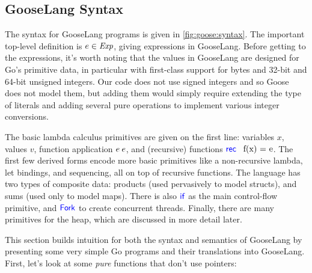 \subsection{GooseLang Syntax}%
\label{sec:goose:syntax}



The syntax for GooseLang programs is given in \cref{fig:goose:syntax}. The
important top-level definition is $e \in \textit{Exp}$, giving expressions in
GooseLang. Before getting to the expressions, it's worth noting that the values
in GooseLang are designed for Go's primitive data, in particular with
first-class support for bytes and 32-bit and 64-bit unsigned integers. Our code does
not use signed integers and so Goose does not model them, but adding them would simply
require extending the type of literals and adding several pure operations to
implement various integer conversions.

The basic lambda calculus primitives are given on the first line: variables $x$,
values $v$, function application $e \: e$, and (recursive) functions $\mbox{\ensuremath{\mathsf{\textcolor{blue}{rec}}} \, f(x) = e}$.
The first few derived forms encode more basic primitives like a non-recursive
lambda, let bindings, and sequencing, all on top of recursive functions. The
language has two types of composite data: products (used pervasively to model
structs), and sums (used only to model maps). There is also $\mathsf{\textcolor{blue}{if}}$ as the
main control-flow primitive, and $\mathsf{\textcolor{blue}{Fork}}$ to create concurrent threads.
Finally, there are many primitives for the heap, which are discussed in more
detail later.

This section builds intuition for both the syntax and semantics of GooseLang by presenting
some very simple Go programs and their translations into GooseLang. First,
let's look at some \emph{pure} functions that don't use pointers:

\newcommand{\translaterule}{\rule{0.9\textwidth}{0.5pt}}

\newenvironment{translatego}{
  \noindent
  \translaterule \\[-10pt]
  \begin{minipage}[t]{0.5\textwidth}
  \strut\vspace*{-\baselineskip}
  \setminted[go]{frame=none}
}{
  \end{minipage}
  \setminted[go]{frame=lines}
}

\newenvironment{translategooselang}{
  \begin{minipage}[t]{0.5\textwidth}
  \strut\vspace*{-8pt}
}{
  \end{minipage}
  \\[5pt] \translaterule
}

